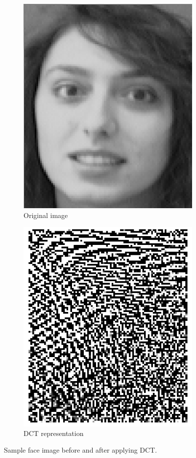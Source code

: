 \documentclass[11pt]{article}
\begin{document}
\begin{figure}[h!]
  \centering
       \begin{subfigure}[t]{0.4\textwidth}
         \centering
         \includegraphics[scale=0.35]{img/1a_orig}
         \caption{Original image}
     \end{subfigure}%
     \quad
     \begin{subfigure}[t]{0.4\textwidth}
         \centering
         \includegraphics[scale=0.35]{img/1a_dct}
         \caption{DCT representation}
     \end{subfigure}
    \caption{Sample face image before and after applying DCT.}
    \label{fig:ex1a}
\end{figure}
\end{document}
